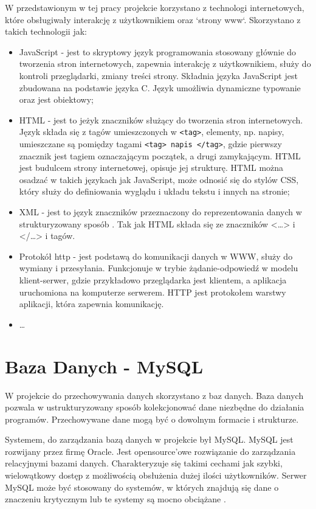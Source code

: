 \documentclass[eng,printmode,oneside]{mgr}
\begin{document}
W przedstawionym w tej pracy projekcie korzystano z technologi internetowych,
które obsługiwały interakcję z użytkownikiem oraz `strony www`. Skorzystano
z takich technologii jak:
\begin{itemize}
  \item JavaScript - jest to skryptowy język programowania stosowany głównie do
  tworzenia stron internetowych, zapewnia interakcję z
  użytkownikiem\cite{javascript.wiki}, służy do kontroli przeglądarki, zmiany
  treści strony. Składnia języka JavaScript jest zbudowana na podstawie języka
  C. Język umożliwia dynamiczne typowanie oraz jest obiektowy;
  \item HTML - jest to jeżyk znaczników służący do tworzenia stron
  internetowych. Język składa się z tagów umieszczonych w \texttt{<tag>},
  elementy, np. napisy, umieszczane są pomiędzy tagami \texttt{<tag> napis
  </tag>}, gdzie pierwszy znacznik jest tagiem oznaczającym początek, a drugi
  zamykającym. HTML jest budulcem strony internetowej, opisuje jej strukturę.
  HTML można osadzać w takich językach jak JavaScript, może odnosić się do
  stylów CSS, który służy do definiowania wyglądu i układu tekstu i innych na
  stronie;
  \item XML - jest to język znaczników przeznaczony do reprezentowania danych w
  strukturyzowany sposób \cite{xml.wiki}. Tak jak HTML składa się ze znaczników
  <\ldots> i </\ldots> i tagów.
  \item Protokół http - jest podstawą do komunikacji danych w WWW, służy do
  wymiany i przesyłania. Funkcjonuje w trybie żądanie-odpowiedź w
  modelu klient-serwer, gdzie przykładowo przeglądarka jest klientem, a
  aplikacja uruchomiona na komputerze serwerem. HTTP jest protokołem warstwy
  aplikacji, która zapewnia komunikację.
  \item \ldots
\end{itemize}

\newpage
\section{Baza Danych - MySQL}

W projekcie do przechowywania danych skorzystano z baz danych. Baza danych
pozwala w ustrukturyzowany sposób kolekcjonować dane niezbędne do działania
programów. Przechowywane dane mogą być o dowolnym formacie i strukturze.

Systemem, do zarządzania bazą danych w projekcie był MySQL. MySQL jest
rozwijany przez firmę Oracle. Jest opensource'owe rozwiązanie do zarządzania
relacyjnymi bazami danych. Charakteryzuje się takimi cechami jak szybki,
wielowątkowy dostęp z możliwością obsłużenia dużej ilości użytkowników. Serwer
MySQL może być stosowany do systemów, w których znajdują się dane o znaczeniu
krytycznym lub te systemy są mocno obciążane \cite{Mysql.com}. 
\end{document}

